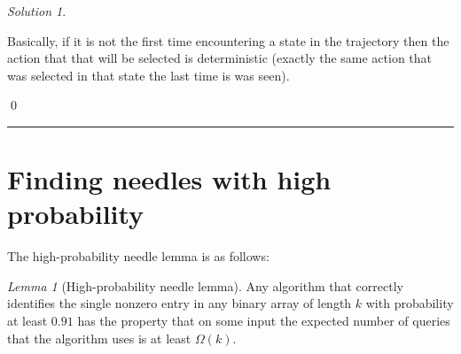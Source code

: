 \documentclass{article}
\DeclareMathOperator*{\1}{\mathbbm{1}}
\newcommand{\0}{\mathbf{0}}
\theoremstyle{definition}
\theoremstyle{remark}
\newtheorem*{solution*}{Solution}
\theoremstyle{theorem}
\newtheorem{lemma}{Lemma}
\begin{document}
\begin{solution*}
\begin{enumerate}
Basically, if it is not the first time encountering a state in the trajectory then the action that that will be selected is deterministic (exactly the same action that was selected in that state the last time is was seen).


\end{enumerate}
\qed\par\smallskip\hrule
\end{solution*}

\section*{Finding needles with high probability}

The high-probability needle lemma is as follows:
\begin{lemma}[High-probability needle lemma]
\label{lem:hpn}
Any algorithm that
correctly identifies the single nonzero entry in any binary array of length $k$
with probability at least $0.91$
has the property that
on some input
the expected number of queries that the algorithm uses is
at least $\Omega(k)$.
\end{lemma}
\end{document}
